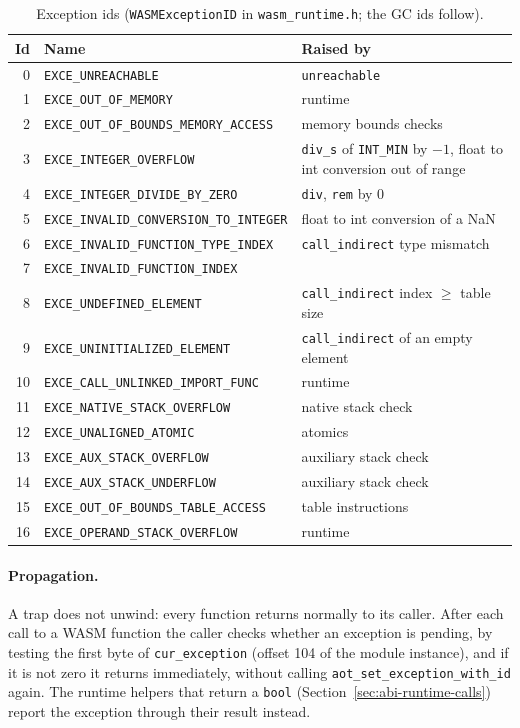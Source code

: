 \documentclass{article}
\begin{document}
\begin{table}[H]
\centering
\begin{tabular}{rll}
    \hline
    Id & Name & Raised by \\
    \hline
    0  & \verb|EXCE_UNREACHABLE| & \verb|unreachable| \\
    1  & \verb|EXCE_OUT_OF_MEMORY| & runtime \\
    2  & \verb|EXCE_OUT_OF_BOUNDS_MEMORY_ACCESS| & memory bounds checks \\
    3  & \verb|EXCE_INTEGER_OVERFLOW| & \verb|div_s| of \verb|INT_MIN| by $-1$, float to int conversion out of range \\
    4  & \verb|EXCE_INTEGER_DIVIDE_BY_ZERO| & \verb|div|, \verb|rem| by 0 \\
    5  & \verb|EXCE_INVALID_CONVERSION_TO_INTEGER| & float to int conversion of a NaN \\
    6  & \verb|EXCE_INVALID_FUNCTION_TYPE_INDEX| & \verb|call_indirect| type mismatch \\
    7  & \verb|EXCE_INVALID_FUNCTION_INDEX| & \\
    8  & \verb|EXCE_UNDEFINED_ELEMENT| & \verb|call_indirect| index $\ge$ table size \\
    9  & \verb|EXCE_UNINITIALIZED_ELEMENT| & \verb|call_indirect| of an empty element \\
    10 & \verb|EXCE_CALL_UNLINKED_IMPORT_FUNC| & runtime \\
    11 & \verb|EXCE_NATIVE_STACK_OVERFLOW| & native stack check \\
    12 & \verb|EXCE_UNALIGNED_ATOMIC| & atomics \\
    13 & \verb|EXCE_AUX_STACK_OVERFLOW| & auxiliary stack check \\
    14 & \verb|EXCE_AUX_STACK_UNDERFLOW| & auxiliary stack check \\
    15 & \verb|EXCE_OUT_OF_BOUNDS_TABLE_ACCESS| & table instructions \\
    16 & \verb|EXCE_OPERAND_STACK_OVERFLOW| & runtime \\
    \hline
\end{tabular}
\caption{Exception ids (\texttt{WASMExceptionID} in \texttt{wasm\_runtime.h}; the GC ids follow).}
\label{table:exception-ids}
\end{table}

\paragraph{Propagation.}
A trap does not unwind: every function returns normally to its caller.
After each call to a WASM function the caller checks whether an exception is pending, by testing the first byte of \verb|cur_exception| (offset 104 of the module instance), and if it is not zero it returns immediately, without calling \verb|aot_set_exception_with_id| again.
The runtime helpers that return a \verb|bool| (Section~\ref{sec:abi-runtime-calls}) report the exception through their result instead.
\end{document}
